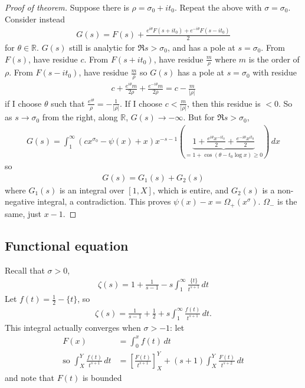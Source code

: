 \documentclass{article}
\newcommand{\1}{\mathbbm{1}}
\begin{document}
\begin{proof}[Proof of theorem]
  Suppose there is $\rho = \sigma_0 + it_0$. Repeat the above with $\sigma = \sigma_0$.
  Consider instead
  \begin{align*}
    G(s) = F(s) + \frac{e^{i\theta} F(s+it_0) + e^{-i\theta}F(s-it_0)}2
  \end{align*}
  for $\theta \in \mathbb{R}$.
  $G(s)$ still is analytic for $\Re s > \sigma_0$, and has a pole at $s=\sigma_0$. From $F(s)$, have residue $c$.
  From $F(s+it_0)$, have residue $\frac{m}{\rho}$ where $m$ is the order of $\rho$.
  From $F(s-it_0)$, have residue $\frac{m}{\bar{\rho}}$
  so $G(s)$ has a pole at $s=\sigma_0$ with residue
  \begin{align*}
    c + \frac{e^{i \theta} m}{2\rho} + \frac{e^{-i\theta}m}{2\bar{\rho}} = c - \frac{m}{|\rho|}
  \end{align*}
  if I choose $\theta$ such that $\frac{e^{i\theta}}{\rho} = -\frac{1}{|\rho|}$.
  If I choose $c < \frac{m}{|\rho|}$, then this residue is $< 0$.
  So as $s \to \sigma_0$ from the right, along $\mathbb{R}$, $G(s) \to -\infty$.
  But for $\Re s > \sigma_0$,
  \begin{align*}
    G(s) = \int_1^\infty (c x^{\sigma_0} - \psi(x) + x)x^{-s-1}\left(\underbrace{1 + \frac{e^{i\theta} x^{-it_0}}{2} + \frac{e^{-i\theta} x^{it_0}}{2}}_{=1 + \cos(\theta - t_0 \log x) \geq 0}\right) \,dx
  \end{align*}
  so
  \begin{align*}
    G(s) = G_1(s) + G_2(s)
  \end{align*}
  where $G_1(s)$ is an integral over $[1,X]$, which is entire, and $G_2(s)$ is a non-negative integral, a contradiction.
  This proves $\psi(x) - x = \Omega_+(x^\sigma)$.
  $\Omega_-$ is the same, just $x-1$.
\end{proof}
\subsection{Functional equation}
\newlec
Recall that $\sigma > 0$,
\begin{align*}
  \zeta(s) = 1 + \frac{1}{s-1} - s \int_1^\infty \frac{\{t\}}{t^{s+1}}\,dt
\end{align*}
Let $f(t) = \frac 12 - \{t\}$, so
\begin{align*}
  \zeta(s) = \frac{1}{s-1} + \frac 12 + s \int_1^\infty \frac{f(t)}{t^{s+1}}\,dt.
\end{align*}
This integral actually converges when $\sigma > -1$: let
\begin{align*}
  F(x) &= \int_0^x f(t)\,dt \\
  \text{so } \int_X^Y \frac{f(t)}{t^{s+1}}\,dt &= \left[\frac{F(t)}{t^{s+1}}\right]_X^Y + (s+1) \int_X^Y \frac{F(t)}{t^{s+2}}\,dt
\end{align*}
and note that $F(t)$ is bounded
\end{document}
